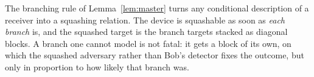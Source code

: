 
\begin{remark}\label{rem:branch-blocks}
The branching rule of Lemma~\ref{lem:master} turns any conditional
description of a receiver into a squashing relation. The device is squashable
as soon as \emph{each branch} is, and the squashed target is the branch
targets stacked as diagonal blocks. A branch one cannot model is not fatal: it
gets a block of its own, on which the squashed adversary rather than Bob's
detector fixes the outcome, but only in proportion to how likely that branch
was.
\end{remark}
